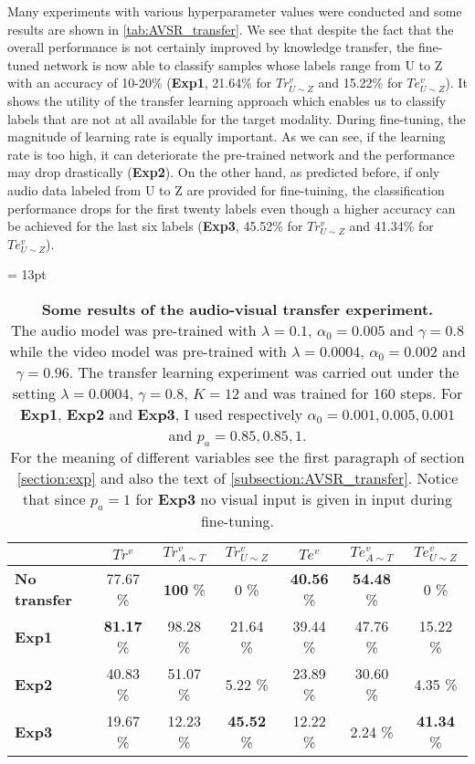 Many experiments with various hyperparameter values were conducted
and some results are shown in \autoref{tab:AVSR_transfer}.
We see that despite the fact that the overall performance is not certainly
improved by knowledge transfer,
the fine-tuned network is now able to classify
samples whose labels range from U to Z with an accuracy of 10-20\%
(\textbf{Exp1}, 21.64\% for $Tr_{U\sim Z}^v$ and 15.22\% for
$Te_{U\sim Z}^v$). It shows the utility of the transfer learning approach
which enables us to classify labels that are not at all available
for the target modality.
During fine-tuning, the magnitude of learning rate is equally important.
As we can see, if the learning rate is too high, it can deteriorate
the pre-trained network and the performance may drop drastically
(\textbf{Exp2}).
On the other hand, as predicted before, if only audio data labeled from
U to Z are provided for fine-tuining, the classification performance
drops for the first twenty labels even though a higher accuracy
can be achieved for the last six labels (\textbf{Exp3}, 45.52\% for
$Tr_{U\sim Z}^v$ and 41.34\% for $Te_{U\sim Z}^v$).

\begin{table}[H]
  \tabcolsep = 13pt
  \caption{\textbf{Some results of the audio-visual transfer experiment.}
    \\[0.1em]
  The audio model was pre-trained with $\lambda=0.1$, $\alpha_0=0.005$ and
  $\gamma=0.8$ while the video model was pre-trained with $\lambda=0.0004$,
  $\alpha_0=0.002$ and $\gamma=0.96$. The transfer learning experiment
  was carried out under the setting $\lambda=0.0004$, $\gamma=0.8$, $K=12$
  and was trained for 160 steps.
  For \textbf{Exp1}, \textbf{Exp2} and \textbf{Exp3}, I used respectively
  $\alpha_0 = 0.001, 0.005, 0.001$ and $p_a = 0.85, 0.85, 1$.\\[0.1em]
  For the meaning of different variables see the first paragraph of
  section \ref{section:exp} and also the text of
  \ref{subsection:AVSR_transfer}.
  Notice that since $p_a = 1$ for \textbf{Exp3} no visual input is given
  in input during fine-tuning.
  }
  \label{tab:AVSR_transfer}
  \begin{tabular*}{\linewidth}{>{\bf}lcccccc}
    \toprule
    & $Tr^v$ & $Tr^v_{A\sim T}$ & $Tr^v_{U\sim Z}$
    & $Te^v$ & $Te^v_{A\sim T}$ & $Te^v_{U\sim Z}$\\
    \midrule
    No transfer & 77.67 \% & \textbf{100} \% & 0 \% & \textbf{40.56} \%
    & \textbf{54.48} \% & 0 \% \\
    Exp1 & \textbf{81.17} \% & 98.28 \% & 21.64 \% & 39.44 \%
    & 47.76 \% & 15.22 \% \\
    Exp2 &  40.83 \% & 51.07 \% & 5.22 \% & 23.89 \%
    & 30.60 \% & 4.35 \% \\
    Exp3 & 19.67 \% & 12.23 \% & \textbf{45.52} \% & 12.22 \%
    & 2.24 \% & \textbf{41.34} \% \\
    \bottomrule
  \end{tabular*}
\end{table}
\vspace{-1em}

